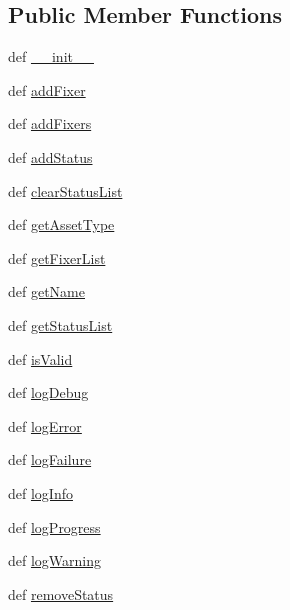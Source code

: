 \subsection*{\-Public \-Member \-Functions}
\begin{DoxyCompactItemize}
\item 
def \hyperlink{classassetQC_1_1api_1_1assetInstance_1_1AssetInstance_acafe9bd6da060d14cc5774a1f0b8147a}{\-\_\-\-\_\-init\-\_\-\-\_\-}
\item 
def \hyperlink{classassetQC_1_1api_1_1assetInstance_1_1AssetInstance_a512401e7dc881a850b1f3f4432261773}{add\-Fixer}
\item 
def \hyperlink{classassetQC_1_1api_1_1assetInstance_1_1AssetInstance_aa97e1b8c2d85efc38809f707dd393d80}{add\-Fixers}
\item 
def \hyperlink{classassetQC_1_1api_1_1assetInstance_1_1AssetInstance_a18106aa241d991f80e9817c5a9b549d2}{add\-Status}
\item 
def \hyperlink{classassetQC_1_1api_1_1assetInstance_1_1AssetInstance_a6ed98c4a5210fd7237ed846600bfbc03}{clear\-Status\-List}
\item 
def \hyperlink{classassetQC_1_1api_1_1assetInstance_1_1AssetInstance_ad0c03f523bc92db99fb8b95dce2693fa}{get\-Asset\-Type}
\item 
def \hyperlink{classassetQC_1_1api_1_1assetInstance_1_1AssetInstance_a4a36d7d043a174eef720159cbea85110}{get\-Fixer\-List}
\item 
def \hyperlink{classassetQC_1_1api_1_1assetInstance_1_1AssetInstance_a463681f87883bdb584f84f7b1005b77b}{get\-Name}
\item 
def \hyperlink{classassetQC_1_1api_1_1assetInstance_1_1AssetInstance_a0aec177c340afee8bbd8b8260392541c}{get\-Status\-List}
\item 
def \hyperlink{classassetQC_1_1api_1_1assetInstance_1_1AssetInstance_a953e63f003c5bb41e53b8f2637e25a7d}{is\-Valid}
\item 
def \hyperlink{classassetQC_1_1api_1_1assetInstance_1_1AssetInstance_acd04d3203fb0bf07e2bcc40996581250}{log\-Debug}
\item 
def \hyperlink{classassetQC_1_1api_1_1assetInstance_1_1AssetInstance_ae19bdace01e43670c06b2970cbeeebe0}{log\-Error}
\item 
def \hyperlink{classassetQC_1_1api_1_1assetInstance_1_1AssetInstance_a360bd99096ef76b7f1c13da62dd419d2}{log\-Failure}
\item 
def \hyperlink{classassetQC_1_1api_1_1assetInstance_1_1AssetInstance_ac433d095934b975876c6aff4b357b6dc}{log\-Info}
\item 
def \hyperlink{classassetQC_1_1api_1_1assetInstance_1_1AssetInstance_a12c6063b40c436cca48860d098db855a}{log\-Progress}
\item 
def \hyperlink{classassetQC_1_1api_1_1assetInstance_1_1AssetInstance_ac1140e88879368cb969a1983ecdb770a}{log\-Warning}
\item 
def \hyperlink{classassetQC_1_1api_1_1assetInstance_1_1AssetInstance_a65f5c08e9539a8229e992ce0045441a6}{remove\-Status}
\end{DoxyCompactItemize}


